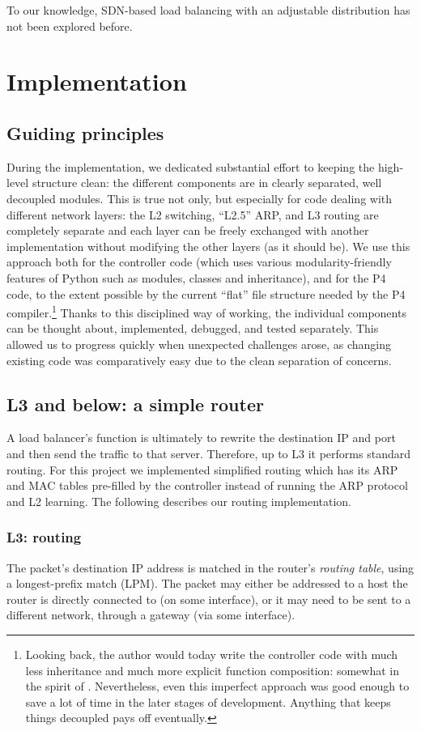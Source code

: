 \documentclass[11pt,oneside,a4paper]{article}
\begin{document}
To our knowledge, SDN-based load balancing with an adjustable distribution has
not been explored before.

\section{Implementation}
\subsection{Guiding principles}
During the implementation, we dedicated substantial effort to keeping the
high-level structure clean: the different components are in clearly separated,
well decoupled modules.
This is true not only, but especially for code dealing with different network
layers: the L2 switching, ``L2.5'' ARP, and L3 routing are completely separate and
each layer can be freely exchanged with another implementation without modifying
the other layers (as it should be).
We use this approach both for the controller code (which uses various
modularity-friendly features of Python such as modules, classes and
inheritance), and for the P4 code, to the extent possible by the current
``flat'' file structure needed by the P4 compiler.\footnote{%
Looking back, the author would today write the controller code with much less
inheritance and much more explicit function composition: somewhat in the
spirit of \cite{inheritance}.
Nevertheless, even this imperfect approach was good enough to save a lot of time
in the later stages of development.
Anything that keeps things decoupled pays off eventually.%
}
Thanks to this disciplined way of working, the individual components can be
thought about, implemented, debugged, and tested separately.
This allowed us to progress quickly when unexpected challenges arose, as
changing existing code was comparatively easy due to the clean separation of
concerns.

\subsection{L3 and below: a simple router}
A load balancer's function is ultimately to rewrite the destination IP and port
and then send the traffic to that server.
Therefore, up to L3 it performs standard routing.
For this project we implemented simplified routing which has its
ARP and MAC tables pre-filled by the controller instead of running the ARP
protocol and L2 learning.
The following describes our routing implementation.

\subsubsection{L3: routing}
The packet's destination IP address is matched in the router's \emph{routing
table}, using a longest-prefix match (LPM).
The packet may either be addressed to a host the router is directly connected to
(on some interface), or it may need to be sent to a different network, through a
gateway (via some interface).
\end{document}
